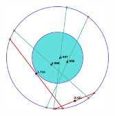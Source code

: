 \begin{itemize}
\begin{figure}[H]
              \includegraphics[width=4cm]{Graphics/circle_3_4.eps}
              \caption{}
              \label{fig:examples_interpretation}
          \end{figure}
\end{itemize}